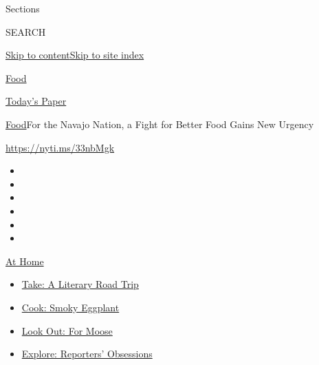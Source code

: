 Sections

SEARCH

\protect\hyperlink{site-content}{Skip to
content}\protect\hyperlink{site-index}{Skip to site index}

\href{https://www.nytimes3xbfgragh.onion/section/food}{Food}

\href{https://myaccount.nytimes3xbfgragh.onion/auth/login?response_type=cookie\&client_id=vi}{}

\href{https://www.nytimes3xbfgragh.onion/section/todayspaper}{Today's
Paper}

\href{/section/food}{Food}\textbar{}For the Navajo Nation, a Fight for
Better Food Gains New Urgency

\url{https://nyti.ms/33nbMgk}

\begin{itemize}
\item
\item
\item
\item
\item
\item
\end{itemize}

\href{https://www.nytimes3xbfgragh.onion/spotlight/at-home?action=click\&pgtype=Article\&state=default\&region=TOP_BANNER\&context=at_home_menu}{At
Home}

\begin{itemize}
\tightlist
\item
  \href{https://www.nytimes3xbfgragh.onion/2020/07/28/books/time-for-a-literary-road-trip.html?action=click\&pgtype=Article\&state=default\&region=TOP_BANNER\&context=at_home_menu}{Take:
  A Literary Road Trip}
\item
  \href{https://www.nytimes3xbfgragh.onion/2020/07/29/magazine/bored-with-your-home-cooking-some-smoky-eggplant-will-fix-that.html?action=click\&pgtype=Article\&state=default\&region=TOP_BANNER\&context=at_home_menu}{Cook:
  Smoky Eggplant}
\item
  \href{https://www.nytimes3xbfgragh.onion/2020/07/27/travel/moose-michigan-isle-royale.html?action=click\&pgtype=Article\&state=default\&region=TOP_BANNER\&context=at_home_menu}{Look
  Out: For Moose}
\item
  \href{https://www.nytimes3xbfgragh.onion/interactive/2020/at-home/even-more-reporters-editors-diaries-lists-recommendations.html?action=click\&pgtype=Article\&state=default\&region=TOP_BANNER\&context=at_home_menu}{Explore:
  Reporters' Obsessions}
\end{itemize}

